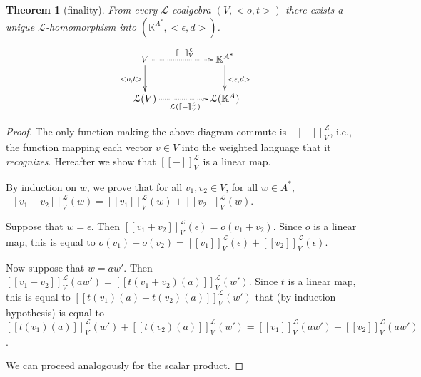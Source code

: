 \documentclass[3p]{elsarticle}
\newcommand{\cbox}[1]{\vspace{0.2cm}\noindent
  \fbox{\parbox{.97\textwidth}{#1}}\vspace{0.2cm}}
\newcommand{\fL}{\mathcal{L}}    %
\newcommand{\emp}{\epsilon}           %
\newcommand{\der}{d}           %
\newcommand{\beh}[3]{\left[\!\left[ #1 \right]\!\right]^{#2}_{#3}} %
\newcommand{\K}{\mathbb{K}}            %
\newtheorem{theorem}{Theorem}
\newtheorem{corollary}{Corollary}
\begin{document}
\begin{theorem}[finality]\label{prop:final}
From every $\fL$-coalgebra $(V,<o,t>)$ there exists a unique
$\fL$-homomorphism into $(\K^{A^*},<\emp,\der>)$.
\[
\xymatrix@C=1.7cm{V \ar[d]_{<o,t>}\ar@{.>}[r]^{\beh{-}{\fL}{V}}& \K^{A^*}\ar[d]^{<\emp,\der>}\\
\fL(V)  \ar@{.>}[r]_{\fL(\beh{-}{\fL}{V})}& \fL(\K^{A})}
\]
\end{theorem}
\begin{proof}
The only function making the above diagram commute is
$\beh{-}{\fL}{V}$, i.e., the function mapping each vector $v\in V$
into the weighted
language that it \emph{recognizes}. %
Hereafter we show that $\beh{-}{\fL}{V}$ is a linear map.

By induction on $w$, we prove that for all $ v_1,v_2 \in V$, for all
$ w \in A^*$,
$\beh{v_1+v_2}{\fL}{V}(w)=\beh{v_1}{\fL}{V}(w)+\beh{v_2}{\fL}{V}(w)$.

Suppose that $w=\epsilon$. Then
$\beh{v_1+v_2}{\fL}{V}(\epsilon)=o(v_1+v_2)$. Since $o$ is a
linear map, this is equal to
$o(v_1)+o(v_2)=\beh{v_1}{\fL}{V}(\epsilon)+\beh{v_2}{\fL}{V}(\epsilon)$.

Now suppose that $w=aw'$. Then
$\beh{v_1+v_2}{\fL}{V}(aw')=\beh{t(v_1+v_2)(a)}{\fL}{V}(w')$. Since
$t$ is a linear map, this is equal to
$\beh{t(v_1)(a)+t(v_2)(a)}{\fL}{V}(w')$ that (by induction
hypothesis) is equal to
$\beh{t(v_1)(a)}{\fL}{V}(w')+\beh{t(v_2)(a)}{\fL}{V}(w')=\beh{v_1}{\fL}{V}(aw')+\beh{v_2}{\fL}{V}(aw')$.

We can proceed analogously for the scalar product.
\end{proof}

%
%


\end{document}
